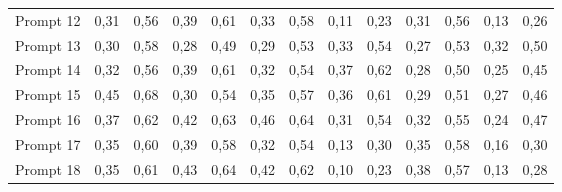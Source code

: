 \begin{tabular}{lrrrrrrrrrrrr}
Prompt 12                                   & 0,31                  & 0,56                    & 0,39                  & 0,61                    & 0,33                  & 0,58                    & 0,11                  & 0,23                    & 0,31                  & 0,56                    & 0,13                  & 0,26                    \\
Prompt 13                                   & 0,30                  & 0,58                    & 0,28                  & 0,49                    & 0,29                  & 0,53                    & 0,33                  & 0,54                    & 0,27                  & 0,53                    & 0,32                  & 0,50                    \\
Prompt 14                                   & 0,32                  & 0,56                    & 0,39                  & 0,61                    & 0,32                  & 0,54                    & 0,37                  & 0,62                    & 0,28                  & 0,50                    & 0,25                  & 0,45                    \\
Prompt 15                                   & 0,45                  & 0,68                    & 0,30                  & 0,54                    & 0,35                  & 0,57                    & 0,36                  & 0,61                    & 0,29                  & 0,51                    & 0,27                  & 0,46                    \\
Prompt 16                                   & 0,37                  & 0,62                    & 0,42                  & 0,63                    & 0,46                  & 0,64                    & 0,31                  & 0,54                    & 0,32                  & 0,55                    & 0,24                  & 0,47                    \\
Prompt 17                                   & 0,35                  & 0,60                    & 0,39                  & 0,58                    & 0,32                  & 0,54                    & 0,13                  & 0,30                    & 0,35                  & 0,58                    & 0,16                  & 0,30                    \\
Prompt 18                                   & 0,35                  & 0,61                    & 0,43                  & 0,64                    & 0,42                  & 0,62                    & 0,10                  & 0,23                    & 0,38                  & 0,57                    & 0,13                  & 0,28                    \\

\end{tabular}
